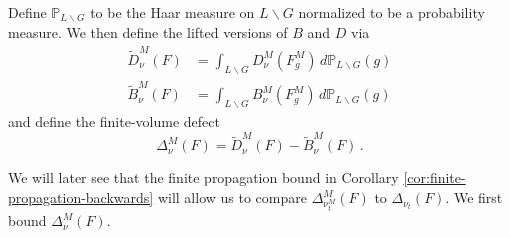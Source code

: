 \documentclass[11pt]{amsart}
\theoremstyle{definition}
\theoremstyle{remark}
\renewcommand{\P}{\mathbb{P}}
\begin{document}
Define $\P_{L \backslash G}$ to be the Haar measure on $L \backslash G$ normalized to be a probability measure.  We then define the lifted versions of $B$ and $D$ via \begin{align*}
	\widetilde{D}_\nu^M(F) &= \int_{L \backslash G} D_\nu^M(F_g^M) \, d\P_{L\backslash G}(g) \\
	\widetilde{B}_\nu^M(F) &= \int_{L \backslash G} B_\nu^M(F_g^M) \, d\P_{L\backslash G}(g)
\end{align*}
and define the finite-volume defect $$\Delta_\nu^M(F) = \widetilde{D}_\nu^M(F) - \widetilde{B}_\nu^M(F)\,.$$

We will later see that the finite propagation bound in Corollary \ref{cor:finite-propagation-backwards} will allow us to compare $\Delta_{\nu_t^M}^M(F)$ to $\Delta_{\nu_t}(F)$.  We first bound $\Delta_\nu^M(F)$.
\end{document}
